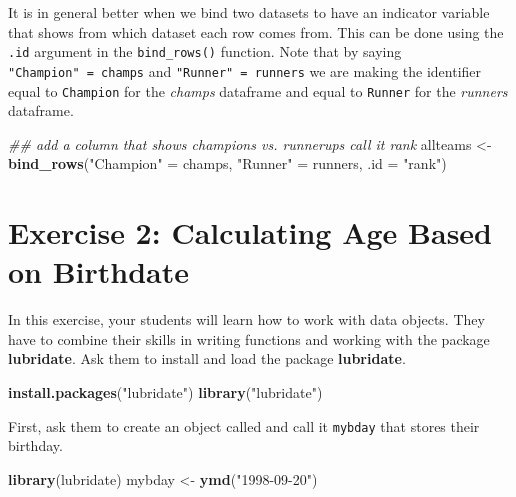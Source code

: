 \documentclass[]{book}
\newenvironment{Shaded}{\begin{snugshade}}{\end{snugshade}}
\newcommand{\CommentTok}[1]{\textcolor[rgb]{0.56,0.35,0.01}{\textit{#1}}}
\newcommand{\DataTypeTok}[1]{\textcolor[rgb]{0.13,0.29,0.53}{#1}}
\newcommand{\KeywordTok}[1]{\textcolor[rgb]{0.13,0.29,0.53}{\textbf{#1}}}
\newcommand{\NormalTok}[1]{#1}
\newcommand{\StringTok}[1]{\textcolor[rgb]{0.31,0.60,0.02}{#1}}
\begin{document}
It is in general better when we bind two datasets to have an indicator variable that shows from which dataset each row comes from. This can be done using the \texttt{.id} argument in the \texttt{bind\_rows()} function. Note that by saying \texttt{"Champion"\ =\ champs} and \texttt{"Runner"\ =\ runners} we are making the identifier equal to \texttt{Champion} for the \emph{champs} dataframe and equal to \texttt{Runner} for the \emph{runners} dataframe.

\begin{Shaded}
\begin{Highlighting}[]
\CommentTok{## add a column that shows champions vs. runnerups call it rank}
\NormalTok{allteams <-}\StringTok{ }\KeywordTok{bind_rows}\NormalTok{(}\StringTok{"Champion"}\NormalTok{ =}\StringTok{ }\NormalTok{champs, }\StringTok{"Runner"}\NormalTok{ =}\StringTok{ }\NormalTok{runners, }\DataTypeTok{.id =} \StringTok{"rank"}\NormalTok{)}
\end{Highlighting}
\end{Shaded}

\hypertarget{exercise-2-calculating-age-based-on-birthdate}{%
\section*{Exercise 2: Calculating Age Based on Birthdate}\label{exercise-2-calculating-age-based-on-birthdate}}

In this exercise, your students will learn how to work with data objects. They have to combine their skills in writing functions and working with the package \textbf{lubridate}. Ask them to install and load the package \textbf{lubridate}.

\begin{Shaded}
\begin{Highlighting}[]
\KeywordTok{install.packages}\NormalTok{(}\StringTok{"lubridate"}\NormalTok{)}
\KeywordTok{library}\NormalTok{(}\StringTok{"lubridate"}\NormalTok{)}
\end{Highlighting}
\end{Shaded}

First, ask them to create an object called and call it \texttt{mybday} that stores their birthday.

\begin{Shaded}
\begin{Highlighting}[]
\KeywordTok{library}\NormalTok{(lubridate)}
\NormalTok{mybday <-}\StringTok{ }\KeywordTok{ymd}\NormalTok{(}\StringTok{"1998-09-20"}\NormalTok{)}
\end{Highlighting}
\end{Shaded}
\end{document}
